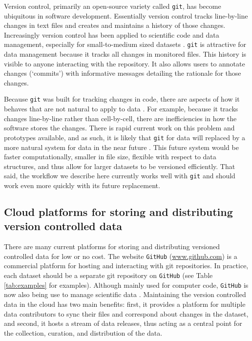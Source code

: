 \documentclass[a4paper,11pt]{article}
\newcommand{\smurl}[1]{{\footnotesize\url{#1}}}
\begin{document}
Version control, primarily an open-source variety called \texttt{git}, has become ubiquitous in software development.  Essentially version control tracks line-by-line changes in text files and creates and maintains a history of those changes. Increasingly version control has been applied to scientific code and data management, especially for small-to-medium sized datasets \citep{Ram-2013, Perkel-2016}. \texttt{git} is attractive for data management because it tracks all changes in monitored files. This history is visible to anyone interacting with the repository. It also allows users to annotate changes (`commits') with informative messages detailing the rationale for those changes.
  
Because \texttt{git} was built for tracking changes in code, there are aspects of how it behaves that are not natural to apply to  data \cite{Perkel-2016}.  For example, because it tracks changes line-by-line rather than cell-by-cell, there are inefficiencies in how the software stores the changes.  There is rapid current work on this problem and prototypes available, and as such, it is likely that \texttt{git} for data will replaced by a more natural system for data in the near future  \citep{Fli, Dat}.  This future system would be faster computationally, smaller in file size, flexible with respect to data structures, and thus allow for larger datasets to be versioned efficiently.  That said, the workflow we describe here currently works well with \texttt{git} and should work even more quickly with its future replacement.

\subsection{Cloud platforms for storing and distributing version controlled data}

There are many current platforms for storing and distributing versioned controlled data for low or no cost.  The website \texttt{GitHub} (\smurl{www.github.com}) is a commercial platform for hosting and interacting with git repositories. In practice, each dataset should be a separate git repository on \texttt{GitHub} (see Table \ref{tab:examples} for examples). Although mainly used for computer code, \texttt{GitHub} is now also being use to manage scientific data \citep{Perkel-2016}. Maintaining the version controlled data in the cloud has two main benefits: first, it provides a platform for multiple data contributors to sync their files and correspond about changes in the dataset, and second, it hosts a stream of data releases, thus acting as a central point for  the collection, curation, and distribution of the data.
\end{document}
